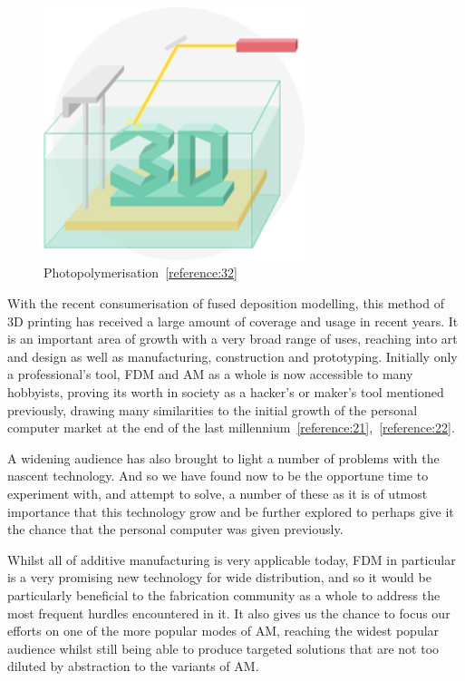 \documentclass[11pt]{report} %
\begin{document}
\begin{figure}[H]
  \centering
  \includegraphics[width=3in]{sla.png}
  \caption{Photopolymerisation~\ref{reference:32}}
  \label{figure:SLA}
\end{figure}

With the recent consumerisation of fused deposition modelling, this method of 3D printing has received a large amount of coverage and usage in recent years. It is an important area of growth with a very broad range of uses, reaching into art and design as well as manufacturing, construction and prototyping. Initially only a professional's tool, FDM and AM as a whole is now accessible to many hobbyists, proving its worth in society as a hacker's or maker's tool mentioned previously, drawing many similarities to the initial growth of the personal computer market at the end of the last millennium~\ref{reference:21},~\ref{reference:22}.

A widening audience has also brought to light a number of problems with the nascent technology. And so we have found now to be the opportune time to experiment with, and attempt to solve, a number of these as it is of utmost importance that this technology grow and be further explored to perhaps give it the chance that the personal computer was given previously.

Whilst all of additive manufacturing is very applicable today, FDM in particular is a very promising new technology for wide distribution, and so it would be particularly beneficial to the fabrication community as a whole to address the most frequent hurdles encountered in it. It also gives us the chance to focus our efforts on one of the more popular modes of AM, reaching the widest popular audience whilst still being able to produce targeted solutions that are not too diluted by abstraction to the variants of AM.
\end{document}
